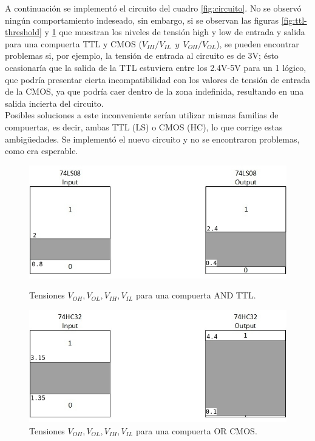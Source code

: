A continuación se implementó el circuito del cuadro \ref{fig:circuito}. No se observó ningún comportamiento indeseado, 
sin embargo, si se observan las figuras \ref{fig:ttl-threshold} y \ref{fig:cmos-threshold} que muestran los niveles de tensión high y low de entrada y salida 
para una compuerta TTL y CMOS ($V_{IH}/V_{IL}~~y~~V_{OH}/V_{OL}$), se pueden encontrar problemas si, por ejemplo, 
la tensión de entrada al circuito es de 3V; ésto ocasionaría que la salida de la TTL estuviera entre los 2.4V-5V para un 1 lógico, 
que podría presentar cierta incompatibilidad con los valores de tensión de entrada de la CMOS, ya que podría caer dentro de la zona indefinida, 
resultando en una salida incierta del circuito.\\
Posibles soluciones a este inconveniente serían utilizar mismas familias de compuertas, es decir, ambas TTL (LS) o CMOS (HC), lo que corrige estas ambigüedades.
Se implementó el nuevo circuito y no se encontraron problemas, como era esperable.

\vspace{5mm}
\begin{figure}[H]
    \begin{minipage}{.49\linewidth}
        \centering
        \captionsetup{justification=centering,margin=1cm}
        \includegraphics[width=.8\linewidth]{./TTLthreshold.jpeg}
        \caption{Tensiones $V_{OH}, V_{OL}, V_{IH}, V_{IL}$ para una compuerta AND TTL.}
        \label{fig:ttl-threshold}
    \end{minipage}
    \begin{minipage}{.5\linewidth}
        \centering
        \captionsetup{justification=centering,margin=1cm}
        \includegraphics[width=.8\linewidth]{./CMOSthreshold.jpeg}
        \caption{Tensiones $V_{OH}, V_{OL}, V_{IH}, V_{IL}$ para una compuerta OR CMOS.}
        \label{fig:cmos-threshold}
    \end{minipage}
\end{figure}
\vspace{5mm}

